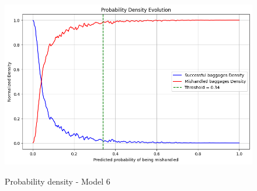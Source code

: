 \documentclass[12pt]{article}
\begin{document}
\begin{figure}
\begin{minipage}[c]{0.5\linewidth}
    \includegraphics[width=1\textwidth]{Probability_density_Model 6.png}\\
    \caption{Probability density - Model 6}
\end{minipage}%
\end{figure}
\end{document}
